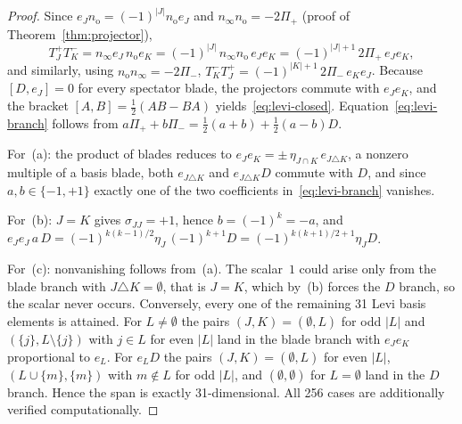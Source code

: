 \documentclass{birkjour}
\theoremstyle{definition}
\theoremstyle{remark}
\numberwithin{equation}{section}
\newcommand{\no}{n_{\mathrm{o}}}
\newcommand{\ninf}{n_{\infty}}
\newenvironment{revblock}{}{}
\begin{document}
\begin{proof}
\begin{revblock}
Since $e_J\no=(-1)^{|J|}\no e_J$ and $\ninf\no=-2\Pi_+$
(proof of Theorem~\ref{thm:projector}),
\begin{equation}
T^+_J T^-_K
=\ninf e_J\,\no e_K
=(-1)^{|J|}\,\ninf\no\,e_J e_K
=(-1)^{|J|+1}\,2\Pi_+\,e_J e_K,
\end{equation}
and similarly, using $\no\ninf=-2\Pi_-$,
$T^-_K T^+_J=(-1)^{|K|+1}\,2\Pi_-\,e_K e_J$.
Because $[D,e_J]=0$ for every spectator blade, the
projectors commute with $e_J e_K$, and the bracket
$[A,B]=\tfrac12(AB-BA)$ yields~\eqref{eq:levi-closed}.
Equation~\eqref{eq:levi-branch} follows from
$a\Pi_++b\Pi_-=\tfrac12(a+b)+\tfrac12(a-b)D$.

For~(a): the product of blades reduces to
$e_J e_K=\pm\,\eta_{J\cap K}\,e_{J\triangle K}$, a nonzero
multiple of a basis blade, both $e_{J\triangle K}$ and
$e_{J\triangle K}D$ commute with $D$, and since
$a,b\in\{-1,+1\}$ exactly one of the two coefficients
in~\eqref{eq:levi-branch} vanishes.

For~(b): $J=K$ gives $\sigma_{JJ}=+1$, hence $b=(-1)^k=-a$,
and
$e_J e_J\,a\,D
=(-1)^{k(k-1)/2}\eta_J\,(-1)^{k+1}D
=(-1)^{k(k+1)/2+1}\eta_J D$.

For~(c): nonvanishing follows from~(a). The scalar~$1$
could arise only from the blade branch with
$J\triangle K=\emptyset$, that is $J=K$, which by~(b)
forces the $D$ branch, so the scalar never occurs.
Conversely, every one of the remaining 31 Levi basis
elements is attained. For $L\neq\emptyset$ the pairs
$(J,K)=(\emptyset,L)$ for odd $|L|$ and
$(\{j\},L\setminus\{j\})$ with $j\in L$ for even $|L|$ land
in the blade branch with $e_J e_K$ proportional to $e_L$.
For $e_L D$ the pairs $(J,K)=(\emptyset,L)$ for even $|L|$,
$(L\cup\{m\},\{m\})$ with $m\notin L$ for odd $|L|$, and
$(\emptyset,\emptyset)$ for $L=\emptyset$ land in the $D$
branch. Hence the span is exactly 31-dimensional. All 256
cases are additionally verified computationally.
\end{revblock}
\end{proof}
\end{document}
